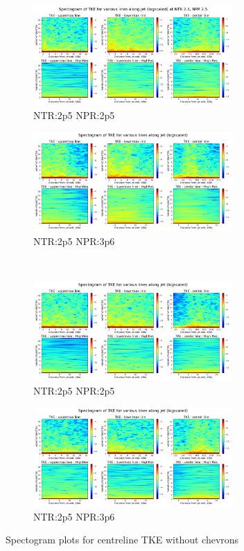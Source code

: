 \begin{figure}[H]
\begin{subfigure}{0.5\textwidth}
	\centering
	\includegraphics[width=3in]{images/Spectogram_TKE_NTR2p5_NPR2p5.png}
	\caption{NTR:2p5 NPR:2p5 }
	\label{fig:setup1}
\end{subfigure}%
\begin{subfigure}{0.5\textwidth}
	\centering
	\includegraphics[width=3in]{images/Spectogram_TKE_NTR2p5_NPR3p0.png}
	\caption{NTR:2p5 NPR:3p6 }
	\label{fig:setup2}
\end{subfigure}\\
\begin{subfigure}{0.5\textwidth}
	\centering
	\includegraphics[width=3in]{images/Spectogram_TKE_NTR2p5_NPR3p6.png}
	\caption{NTR:2p5 NPR:2p5 }
	\label{fig:setup1}
\end{subfigure}%
\begin{subfigure}{0.5\textwidth}
	\centering
	\includegraphics[width=3in]{images/Spectogram_TKE_NTR2p5_NPR4p0.png}
	\caption{NTR:2p5 NPR:3p6 }
	\label{fig:setup2}
\end{subfigure}
\caption{Spectogram plots for centreline TKE without chevrons }
\label{fig:spectogramTKE}
\end{figure} 

